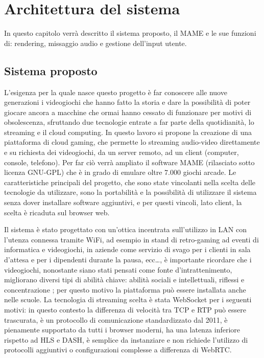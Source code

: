 %
%

\chapter{Architettura del sistema}
In questo capitolo verrà descritto il sistema proposto, il MAME e le sue funzioni di: rendering, missaggio audio e gestione dell'input utente.



\section{Sistema proposto}
L'esigenza per la quale nasce questo progetto è far conoscere alle nuove generazioni i videogiochi che hanno fatto la storia e dare la possibilità di poter giocare ancora a macchine che ormai hanno cessato di funzionare per motivi di obsolescenza, sfruttando due tecnologie entrate a far parte della quotidianità, lo streaming e il cloud computing. In questo lavoro si propone la creazione di una piattaforma di cloud gaming, che permette lo streaming audio-video direttamente e su richiesta dei videogiochi, da un server remoto, ad un client (computer, console, telefono). Per far ciò verrà ampliato il software MAME (rilasciato sotto licenza GNU-GPL) che è in grado di emulare oltre 7.000 giochi arcade. Le caratteristiche principali del progetto, che sono state vincolanti nella scelta delle tecnologie da utilizzare, sono la portabilità e la possibilità di utilizzare il sistema senza dover installare software aggiuntivi, e per questi vincoli, lato client, la scelta è ricaduta sul browser web.

Il sistema è stato progettato con un'ottica incentrata sull'utilizzo in LAN con l'utenza connessa tramite WiFi, ad esempio in stand di retro-gaming ad eventi di informatica e videogiochi, in aziende come servizio di svago per i clienti in sala d'attesa e per i dipendenti durante la pausa, ecc\dots, è importante ricordare che i videogiochi, nonostante siano stati pensati come fonte d'intrattenimento, migliorano diversi tipi di abilità chiave: abilità sociali e intellettuali, riflessi e concentrazione \parencite{Use_of_Cloud_Gaming_in_Education}; per questo motivo la piattaforma può essere installata anche nelle scuole. La tecnologia di streaming scelta è stata WebSocket per i seguenti motivi: in questo contesto la differenza di velocità tra TCP e RTP può essere trascurata, è un protocollo di comunicazione standardizzato dal 2011, è pienamente supportato da tutti i browser moderni, ha una latenza inferiore rispetto ad HLS e DASH, è semplice da instanziare e non richiede l'utilizzo di protocolli aggiuntivi o configurazioni complesse a differenza di WebRTC.

